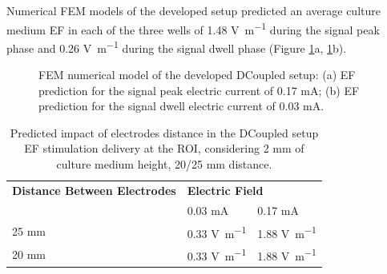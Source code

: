 Numerical \ac{FEM} models of the developed setup predicted an average culture medium \acs{EF} in each of the three wells of 1.48 \si{\volt\per\meter} during the signal peak phase and 0.26 \si{\volt\per\meter} during the signal dwell phase (Figure \ref{fig4d6}a, \ref{fig4d6}b).


\begin{figure}
\caption{FEM numerical model of the developed DCoupled setup: (a) EF prediction for the signal peak electric current of 0.17 \si{\milli\ampere}; (b) EF prediction for the signal dwell electric current of 0.03 \si{\milli\ampere}.}
\label{fig4d6}
\end{figure}

\begin{table}
\caption{Predicted impact of electrodes distance in the DCoupled setup \acs{EF} stimulation delivery at the \acs{ROI}, considering 2 \si{\milli\meter} of culture medium height, 20/25 \si{\milli\meter} distance.}
\bigskip
\small
\centering
\begin{tabularx}{280px}{lll} \toprule[0.15em]
 \textbf{Distance Between Electrodes} & \multicolumn{2}{l}{\textbf{Electric Field}} \\ \cmidrule(l){2-3}
 & 0.03 \si{\milli\ampere} & 0.17 \si{\milli\ampere} \\ \cmidrule(r){1-3}
25 \si{\milli\meter}  & 0.33 \si{\volt\per\meter} & 1.88 \si{\volt\per\meter} \\
20 \si{\milli\meter}  & 0.33 \si{\volt\per\meter} & 1.88 \si{\volt\per\meter} \\ \bottomrule[0.15em] 
\end{tabularx}
\label{tab4d1}
\end{table}


